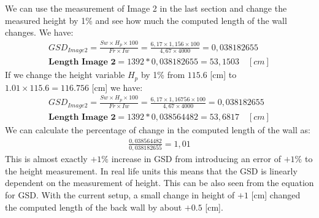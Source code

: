 We can use the measurement of Image 2 in the last section and change the measured height by 1\% and see how much the computed length of the wall changes. We have:
\begin{align*}
GSD_{Image 2} = \frac{Sw\times H_p\times 100}{Fr\times Iw} = \frac{6,17\times1,156\times100}{4,67\times4000} = 0,038182655\\
\textbf{Length Image 2} = 1392*0,038182655 = 53,1503\quad[cm]
\end{align*}
If we change the height variable $H_p$ by 1\% from $115.6$ [cm] to $1.01\times 115.6 = 116.756$ [cm] we have:
\begin{align*}
GSD_{Image 2} = \frac{Sw\times H_p\times 100}{Fr\times Iw} = \frac{6,17\times1,16756\times100}{4,67\times4000} = 0,038182655\\
\textbf{Length Image 2} = 1392*0,038564482 = 53,6817\quad[cm]
\end{align*}
We can calculate the percentage of change in the computed length of the wall as:
\begin{align*}
\frac{0,038564482}{0,038182655} = 1,01
\end{align*}
This is almost exactly $+1\%$ increase in GSD from introducing an error of $+1\%$ to the height measurement. In real life units this means that the GSD is linearly dependent on the measurement of height. This can be also seen from the equation for GSD. With the current setup, a small change in height of $+1$ [cm] changed the computed length of the back wall by about $+0.5$ [cm]. 

